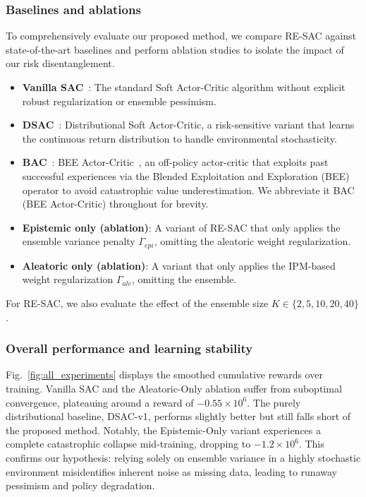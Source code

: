 \documentclass[10pt]{article}
\begin{document}
\subsubsection{Baselines and ablations}
To comprehensively evaluate our proposed method, we compare RE-SAC against state-of-the-art baselines and perform ablation studies to isolate the impact of our risk disentanglement.
\begin{itemize}
    \item \textbf{Vanilla SAC}~\cite{Haarnoja2018SAC}: The standard Soft Actor-Critic algorithm without explicit robust regularization or ensemble pessimism.
    \item \textbf{DSAC}~\cite{Ma2025DSAC}: Distributional Soft Actor-Critic, a risk-sensitive variant that learns the continuous return distribution to handle environmental stochasticity.
    \item \textbf{BAC}~\cite{Ji2024SeizingSerendipity}: BEE Actor-Critic~\cite{Ji2024SeizingSerendipity}, an off-policy actor-critic that exploits past successful experiences via the Blended Exploitation and Exploration (BEE) operator to avoid catastrophic value underestimation. We abbreviate it BAC (BEE Actor-Critic) throughout for brevity.
    \item \textbf{Epistemic only (ablation)}: A variant of RE-SAC that only applies the ensemble variance penalty $\Gamma_{epi}$, omitting the aleatoric weight regularization.
    \item \textbf{Aleatoric only (ablation)}: A variant that only applies the IPM-based weight regularization $\Gamma_{ale}$, omitting the ensemble.
\end{itemize}
For RE-SAC, we also evaluate the effect of the ensemble size $K \in \{2, 5, 10, 20, 40\}$.

\subsubsection{Overall performance and learning stability}
Fig.~\ref{fig:all_experiments} displays the smoothed cumulative rewards over training. Vanilla SAC and the Aleatoric-Only ablation suffer from suboptimal convergence, plateauing around a reward of $-0.55 \times 10^6$. The purely distributional baseline, DSAC-v1, performs slightly better but still falls short of the proposed method. Notably, the Epistemic-Only variant experiences a complete catastrophic collapse mid-training, dropping to $-1.2 \times 10^6$. This confirms our hypothesis: relying solely on ensemble variance in a highly stochastic environment misidentifies inherent noise as missing data, leading to runaway pessimism and policy degradation.
\end{document}

